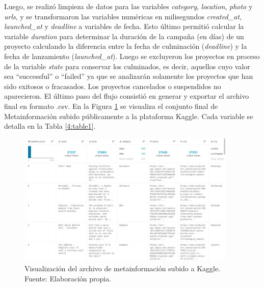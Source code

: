 Luego, se realizó limpieza de datos para las variables \textit{category}, \textit{location}, \textit{photo} y \textit{urls}, y se transformaron las variables numéricas en milisegundos \textit{created\_at}, \textit{launched\_at} y \textit{deadline} a variables de fecha. Esto último permitió calcular la variable \textit{duration} para determinar la duración de la campaña (en días) de un proyecto calculando la diferencia entre la fecha de culminación (\textit{deadline}) y la fecha de lanzamiento (\textit{launched\_at}). Luego se excluyeron los proyectos en proceso de la variable \textit{state} para conservar los culminados, es decir, aquellos cuyo valor sea “successful” o “failed” ya que se analizarán solamente los proyectos que han sido exitosos o fracasados. Los proyectos cancelados o suspendidos no aparecieron. El último paso del flujo consistió en generar y exportar el archivo final en formato .csv. En la Figura \ref{4:fig4} se visualiza el conjunto final de Metainformación subido públicamente a la plataforma Kaggle. Cada variable se detalla en la Tabla \ref{4:table1}.

\begin{figure}[h]
	\begin{center}
		\includegraphics[width=0.93\textwidth]{4/figures/metadata_kaggle_preview.jpg}
		\caption[Visualización del archivo de metainformación subido a Kaggle]{Visualización del archivo de metainformación subido a Kaggle.\\
			Fuente: Elaboración propia.}
		\label{4:fig4}
	\end{center}
\end{figure}

